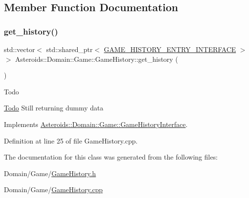 \subsection{Member Function Documentation}
\mbox{\label{classAsteroids_1_1Domain_1_1Game_1_1GameHistory_ad01c0196f3b831e06ae03d86d659ec6f}} 
\subsubsection{\texorpdfstring{get\+\_\+history()}{get\_history()}}
{\footnotesize\ttfamily std\+::vector$<$ std\+::shared\+\_\+ptr$<$ \hyperlink{classAsteroids_1_1Domain_1_1Game_1_1GAME__HISTORY__ENTRY__INTERFACE}{G\+A\+M\+E\+\_\+\+H\+I\+S\+T\+O\+R\+Y\+\_\+\+E\+N\+T\+R\+Y\+\_\+\+I\+N\+T\+E\+R\+F\+A\+CE} $>$ $>$ Asteroids\+::\+Domain\+::\+Game\+::\+Game\+History\+::get\+\_\+history (\begin{DoxyParamCaption}{ }\end{DoxyParamCaption})\hspace{0.3cm}{\ttfamily [virtual]}}

\begin{DoxyRefDesc}{Todo}
\item[\hyperlink{todo__todo000005}{Todo}]Still returning dummy data \end{DoxyRefDesc}


Implements \hyperlink{classAsteroids_1_1Domain_1_1Game_1_1GameHistoryInterface_a0a992e10b08943b0ea01b862f9ffddd4}{Asteroids\+::\+Domain\+::\+Game\+::\+Game\+History\+Interface}.



Definition at line 25 of file Game\+History.\+cpp.



The documentation for this class was generated from the following files\+:\begin{DoxyCompactItemize}
\item 
Domain/\+Game/\hyperlink{GameHistory_8h}{Game\+History.\+h}\item 
Domain/\+Game/\hyperlink{GameHistory_8cpp}{Game\+History.\+cpp}\end{DoxyCompactItemize}
